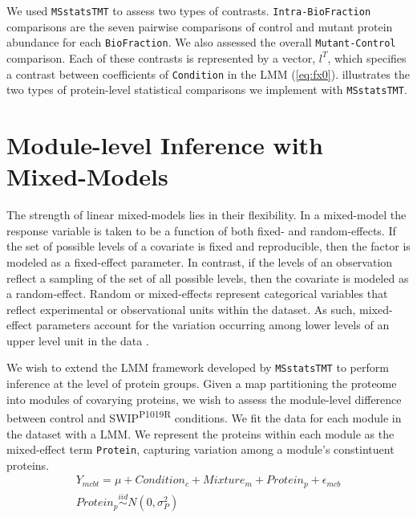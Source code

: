 \documentclass[11pt]{elife}\usepackage[]{graphicx}\usepackage[]{color}
\begin{document}
We used \texttt{MSstatsTMT} to assess two types of contrasts.
\texttt{Intra-BioFraction} comparisons are the seven pairwise comparisons of
control and mutant protein abundance for each \texttt{BioFraction}.  We also
assessed the overall \texttt{Mutant-Control} comparison.  Each of these
contrasts is represented by a vector, $l^T$, which specifies a contrast between
coefficients of \texttt{Condition} in the LMM (\ref{eq:fx0}).  
illustrates the two types of protein-level statistical comparisons we implement
with \texttt{MSstatsTMT}.


\section{Module-level Inference with Mixed-Models}

The strength of linear mixed-models lies in their flexibility. In a mixed-model
the response variable is taken to be a function of both fixed- and
random-effects.  If the set of possible levels of a covariate is fixed and
reproducible, then the factor is modeled as a fixed-effect parameter.  In
contrast, if the levels of an observation reflect a sampling of the set of all
possible levels, then the covariate is modeled as a random-effect.  Random or
mixed-effects represent categorical variables that reflect experimental or
observational units within the dataset.  As such, mixed-effect parameters
account for the variation occurring among lower levels of an upper level unit in
the data \citep{Bates2015}.  

We wish to extend the LMM framework developed by \texttt{MSstatsTMT} to perform
inference at the level of protein groups. Given a map partitioning the proteome
into modules of covarying proteins, we wish to assess the module-level
difference between control and SWIP\textsuperscript{P1019R} conditions. We fit
the data for each module in the dataset with a LMM. We represent the proteins
within each module as the mixed-effect term \texttt{Protein}, capturing
variation among a module's constintuent proteins.
\begin{equation} 
  \begin{gathered}\label{eq:fx1} %
	Y_{mcbt} = \mu + Condition_c + Mixture_m + Protein_p + \epsilon_{mcb}\\
	Protein_p \stackrel{iid}{\sim} N(0,\sigma^2_P) \\
  \end{gathered}
\end{equation}
\end{document}

